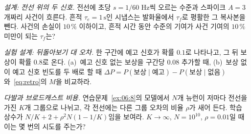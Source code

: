 \begin{exercise}[\lvlB]
\label{ex:07:6}
\emph{설계: 전선 위의 두 신호.}  전선에 초당 $s=1/60$ Hz씩 오르는 수준과 스파이크 $A=3$개짜리 사건이 흐른다. 흔적 $\tau_e=1\,\text{s}$인 시냅스는 발화율에서 $\tau_f$로 평활한 그 복사본을 뺀다. 사건의 손실이 $10\,\%$ 이하이고, 흔적 시간 동안 수준의 기여가 사건 기여의 $10\,\%$ 미만이 되는 $\tau_f$는?
\end{exercise}

\begin{exercise}[\lvlB]
\label{ex:07:7}
\emph{실험 설계: 뒤돌아보기 대 오차.} 한 구간에 예고 신호가 확률 $0.1$로 나타나고, 그 뒤 보상이 확률 $0.8$로 온다. (a)~예고 신호 없는 보상을 구간당 $0.08$ 추가할 때, (b)~보상 없이 예고 신호 빈도를 두 배로 할 때 $\Delta P=P(\text{보상}\mid\text{예고})-P(\text{보상}\mid\text{없음})$와~\eqref{eq:retro}의 $M$을 비교하라.
\end{exercise}

\begin{exercise}[\lvlC]
\label{ex:07:8}
\emph{다발과 브로드캐스트 비용.} 연습문제~\ref{ex:06:8}의 모델에서 $N$개 뉴런이 저마다 전선을 가진 $K$개 그룹으로 나뉘고, 각 전선에는 다른 그룹 오차의 비율 $\rho$가 새어 든다. 학습 상수가 $N/K+2+\rho^2N(1-1/K)$임을 보여라. $K\to\infty$, $N=10^{10}$, $\rho=0.01$일 때 이는 몇 번의 시도를 주는가?
\end{exercise}
